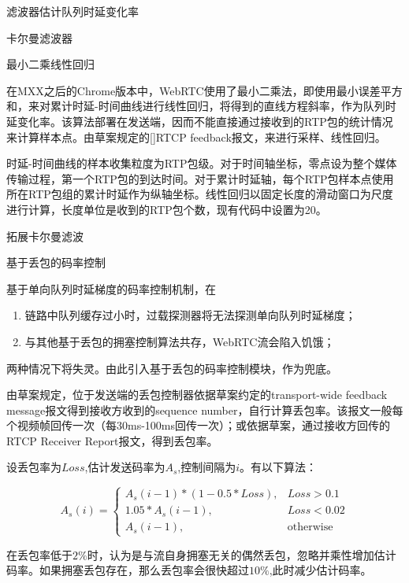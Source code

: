 滤波器估计队列时延变化率

卡尔曼滤波器

最小二乘线性回归

在MXX之后的Chrome版本中，WebRTC使用了最小二乘法，即使用最小误差平方和，来对累计时延-时间曲线进行线性回归，将得到的直线方程斜率，作为队列时延变化率。该算法部署在发送端，因而不能直接通过接收到的RTP包的统计情况来计算样本点。由草案规定的[]RTCP feedback报文，来进行采样、线性回归。

时延-时间曲线的样本收集粒度为RTP包级。对于时间轴坐标，零点设为整个媒体传输过程，第一个RTP包的到达时间。对于累计时延轴，每个RTP包样本点使用所在RTP包组的累计时延作为纵轴坐标。线性回归以固定长度的滑动窗口为尺度进行计算，长度单位是收到的RTP包个数，现有代码中设置为20。






拓展卡尔曼滤波


基于丢包的码率控制

基于单向队列时延梯度的码率控制机制，在

\begin{enumerate}
    \item 链路中队列缓存过小时，过载探测器将无法探测单向队列时延梯度；
    \item 与其他基于丢包的拥塞控制算法共存，WebRTC流会陷入饥饿；
\end{enumerate}

两种情况下将失灵。由此引入基于丢包的码率控制模块，作为兜底。

由草案\parencite{rmcat-gcc}规定，位于发送端的丢包控制器依据草案\parencite{twcc}约定的transport-wide feedback message报文得到接收方收到的sequence number，自行计算丢包率。该报文一般每个视频帧回传一次（每30ms-100ms回传一次）；或依据草案\parencite{rmcat-remb}，通过接收方回传的RTCP Receiver Report报文，得到丢包率。

设丢包率为$Loss$,估计发送码率为$A_s$,控制间隔为$i$。有以下算法：

\begin{equation*}
A_s(i) = \begin{cases}
    A_s(i-1) * (1- 0.5*Loss),& Loss > 0.1\\
    1.05 * A_s(i-1),& Loss < 0.02\\
    A_s(i-1), & \text{otherwise}
\end{cases}
\end{equation*}

在丢包率低于$2\%$时，认为是与流自身拥塞无关的偶然丢包，忽略并乘性增加估计码率。如果拥塞丢包存在，那么丢包率会很快超过$10\%$,此时减少估计码率。







